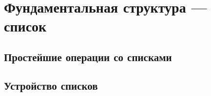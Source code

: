 \section{Фундаментальная структура --- список}\label{common-lisp:baseconstructions:list}
\subsection{Простейшие операции со списками}\label{common-lisp:baseconstructions:defun:list:base}
\subsection{Устройство списков}\label{common-lisp:baseconstructions:defun:list:construction}
